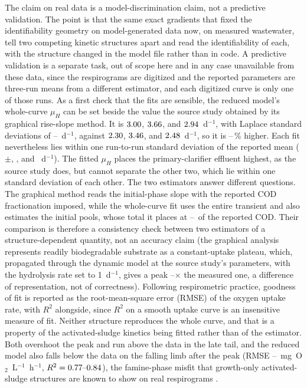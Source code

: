 \documentclass{article}
\begin{document}
The claim on real data is a model-discrimination claim, not a predictive validation. The point is that the same exact gradients that fixed the identifiability geometry on model-generated data now, on measured wastewater, tell two competing kinetic structures apart and read the identifiability of each, with the structure changed in the model file rather than in code. A predictive validation is a separate task, out of scope here and in any case unavailable from these data, since the respirograms are digitized and the reported parameters are three-run means from a different estimator, and each digitized curve is only one of those runs. As a first check that the fits are sensible, the reduced model's whole-curve \(\mu_H\) can be set beside the value the source study obtained by its graphical rise-slope method. It is \(3.00\), \(3.66\), and \(2.94\)~d\(^{-1}\), with Laplace standard deviations of \RespDrMuStdLo--\RespDrMuStdHi~d\(^{-1}\), against \(2.30\), \(3.46\), and \(2.48\)~d\(^{-1}\), so it is \RespDrErrBest--\RespDrErrWorst\,\% higher. Each fit nevertheless lies within one run-to-run standard deviation of the reported mean (\(\pm\)\RespMuRepSdRWW, \RespMuRepSdPCE, and \RespMuRepSdRBFE~d\(^{-1}\)). The fitted \(\mu_H\) places the primary-clarifier effluent highest, as the source study does, but cannot separate the other two, which lie within one standard deviation of each other. The two estimators answer different questions. The graphical method reads the initial-phase slope with the reported COD fractionation imposed, while the whole-curve fit uses the entire transient and also estimates the initial pools, whose total it places at \RespCodRatioLo--\RespCodRatioHi\ of the reported COD. Their comparison is therefore a consistency check between two estimators of a structure-dependent quantity, not an accuracy claim (the graphical analysis represents readily biodegradable substrate as a constant-uptake plateau, which, propagated through the dynamic model at the source study's parameters, with the hydrolysis rate set to 1~d\(^{-1}\), gives a peak \RespGuptaOverLo--\RespGuptaOverHi\(\times\) the measured one, a difference of representation, not of correctness). Following respirometric practice, goodness of fit is reported as the root-mean-square error (RMSE) of the oxygen uptake rate, with \(R^2\) alongside, since \(R^2\) on a smooth uptake curve is an insensitive measure of fit. Neither structure reproduces the whole curve, and that is a property of the activated-sludge kinetics being fitted rather than of the estimator. Both overshoot the peak and run above the data in the late tail, and the reduced model also falls below the data on the falling limb after the peak (RMSE \RespDrRmseLo--\RespDrRmseHi~mg~O\(_2\)~L\(^{-1}\)~h\(^{-1}\), \(R^2=0.77\text{--}0.84\)), the famine-phase misfit that growth-only activated-sludge structures are known to show on real respirograms \citep{guisasola2005}.
\end{document}
